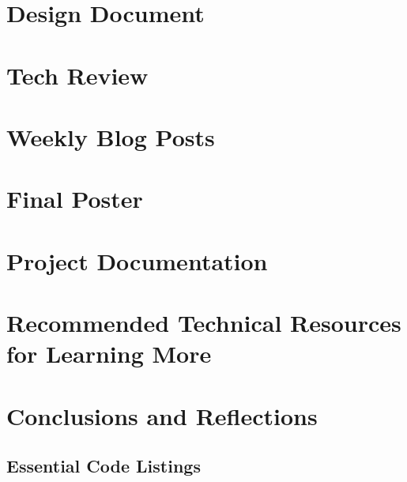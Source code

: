 \documentclass[onecolumn, draftclsnofoot,10pt, compsoc]{IEEEtran}
\begin{document}
\section{Design Document}
\section{Tech Review}
\section{Weekly Blog Posts}
\section{Final Poster}
\section{Project Documentation}
\section{Recommended Technical Resources for Learning More}
\section{Conclusions and Reflections}
\appendix
\subsection{Essential Code Listings}
\end{document}

